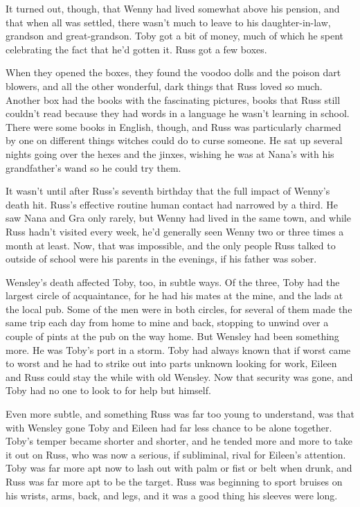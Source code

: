 It turned out, though, that Wenny had lived somewhat above his pension, and that when all was settled, there wasn't much to leave to his daughter-in-law, grandson and great-grandson. Toby got a bit of money, much of which he spent celebrating the fact that he'd gotten it. Russ got a few boxes.

When they opened the boxes, they found the voodoo dolls and the poison dart blowers, and all the other wonderful, dark things that Russ loved so much. Another box had the books with the fascinating pictures, books that Russ still couldn't read because they had words in a language he wasn't learning in school. There were some books in English, though, and Russ was particularly charmed by one on different things witches could do to curse someone. He sat up several nights going over the hexes and the jinxes, wishing he was at Nana's with his grandfather's wand so he could try them.

It wasn't until after Russ's seventh birthday that the full impact of Wenny's death hit. Russ's effective routine human contact had narrowed by a third. He saw Nana and Gra only rarely, but Wenny had lived in the same town, and while Russ hadn't visited every week, he'd generally seen Wenny two or three times a month at least. Now, that was impossible, and the only people Russ talked to outside of school were his parents in the evenings, if his father was sober.

Wensley's death affected Toby, too, in subtle ways. Of the three, Toby had the largest circle of acquaintance, for he had his mates at the mine, and the lads at the local pub. Some of the men were in both circles, for several of them made the same trip each day from home to mine and back, stopping to unwind over a couple of pints at the pub on the way home. But Wensley had been something more. He was Toby's port in a storm. Toby had always known that if worst came to worst and he had to strike out into parts unknown looking for work, Eileen and Russ could stay the while with old Wensley. Now that security was gone, and Toby had no one to look to for help but himself.

Even more subtle, and something Russ was far too young to understand, was that with Wensley gone Toby and Eileen had far less chance to be alone together. Toby's temper became shorter and shorter, and he tended more and more to take it out on Russ, who was now a serious, if subliminal, rival for Eileen's attention. Toby was far more apt now to lash out with palm or fist or belt when drunk, and Russ was far more apt to be the target. Russ was beginning to sport bruises on his wrists, arms, back, and legs, and it was a good thing his sleeves were long.


